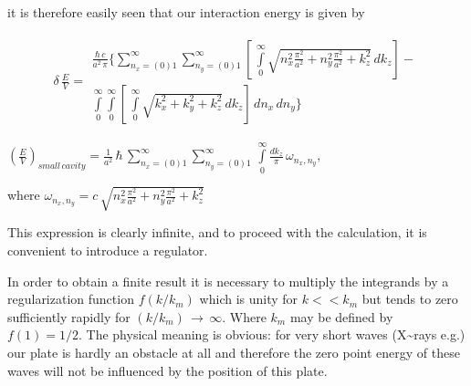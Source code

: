 \documentclass[11pt]{article}
\begin{document}
    it is therefore easily seen that our interaction energy is given by


    \begin{equation} \label{eq:1}
\begin{array}{lr}
\delta\,\frac{E}{V} =
\begin{array}{c}
\frac{\hbar\,c}{a^2\,\pi}\Bigg\{\sum\limits_{n_x=(0)1}^{\infty}\sum\limits_{n_y=(0)1}^{\infty}\left[\,\int\limits_{0}^{\infty}\sqrt{n_x^2\frac{\pi^2}{a^2}+n_y^2\frac{\pi^2}{a^2}+k_z^2}\,dk_z\right] - \\ \int\limits_{0}^{\infty}\int\limits_{0}^{\infty}\left[\,\int\limits_{0}^{\infty}\sqrt{k_x^2+k_y^2+k_z^2}\,dk_z\right]\,dn_x\,dn_y\Bigg\}
\end{array}\end{array}\end{equation}

    

    \({\left(\frac{E}{V}\right)_{small\,cavity} = \frac{1}{a^2}\,\hbar \, \sum\limits_{n_x=(0)1}^{\infty}\sum\limits_{n_y=(0)1}^{\infty}\,\int\limits_{0}^{\infty} {\frac {dk_{z}}{\pi}}\,\omega _{n_x,n_y},}\)

    where
\(\omega _{n_x,n_y} = c\,\sqrt{n_x^2\frac{\pi^2}{a^2}+n_y^2\frac{\pi^2}{a^2}+k_z^2}\)

    This expression is clearly infinite, and to proceed with the
calculation, it is convenient to introduce a regulator.

    In order to obtain a finite result it is necessary to multiply the
integrands by a regularization function \(f(k/k_m)\) which is unity for
\(k << k_m\) but tends to zero sufficiently rapidly for
\((k/k_m)\, \rightarrow\,\infty\). Where \(k_m\) may be defined by
\(f(1) = {1}/{2}\). The physical meaning is obvious: for very short
waves (X\textasciitilde{}rays e.g.) our plate is hardly an obstacle at
all and therefore the zero point energy of these waves will not be
influenced by the position of this plate.
\end{document}
